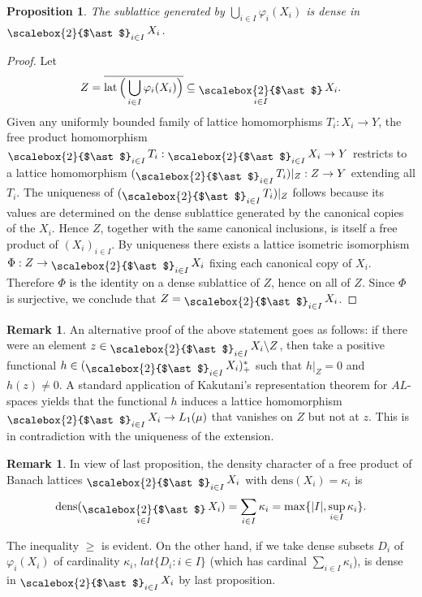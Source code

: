 \documentclass[12pt]{amsart}
\DeclareMathOperator{\lat}{lat}
\DeclareMathOperator*{\bigfree}{\raisebox{-0.6ex}{\scalebox{2}{$\ast$}}}
\theoremstyle{plain}
\newtheorem{proposition}[theorem]{Proposition}
\theoremstyle{definition}
\newtheorem{remark}[theorem]{Remark}
\begin{document}
\begin{proposition}\label{prop:dense-sublattice}
The sublattice generated by $\bigcup_{i\in I}\varphi_i(X_i)$ is dense in $\bigfree_{i\in I}X_i$.
\end{proposition}

\begin{proof}
Let
\[
Z=\overline{\lat\Big(\bigcup_{i\in I}\varphi_i(X_i)\Big)} \subseteq \bigfree_{i\in I}X_i.
\]
Given any uniformly bounded family of lattice homomorphisms $T_i:X_i\to Y$, the free product homomorphism $\bigfree_{i\in I}T_i:\bigfree_{i\in I}X_i\to Y$ restricts to a lattice homomorphism $(\bigfree_{i\in I}T_i)|_Z:Z\to Y$ extending all $T_i$. The uniqueness of $(\bigfree_{i\in I}T_i)|_Z$ follows because its values are determined on the dense sublattice generated by the canonical copies of the $X_i$. Hence $Z$, together with the same canonical inclusions, is itself a free product of $(X_i)_{i\in I}$. By uniqueness there exists a lattice isometric isomorphism $\Phi:Z\to \bigfree_{i\in I}X_i$ fixing each canonical copy of $X_i$. Therefore $\Phi$ is the identity on a dense sublattice of $Z$, hence on all of $Z$. Since $\Phi$ is surjective, we conclude that $Z=\bigfree_{i\in I}X_i$.
\end{proof}

\begin{remark} An alternative proof of the above statement goes as follows: if there were an element $z\in \bigfree_{i\in I}X_i\backslash Z$, then take a positive functional $h\in (\bigfree_{i\in I} X_i)^*_+$ such that $h|_Z=0$ and $h(z)\neq 0$. A standard application of Kakutani's representation theorem for $AL$-spaces yields that the functional $h$ induces a lattice homomorphism $\bigfree_{i\in I} X_i\rightarrow L_1(\mu)$ that vanishes on $Z$ but not at $z$. This is in contradiction with the uniqueness of the extension.
\end{remark}

\begin{remark}
In view of last proposition, the density character of a free product of Banach lattices $\bigfree_{i\in I} X_i$ with $\text{dens}(X_i)=\kappa_i$ is 
\begin{align*}
\text{dens}(\bigfree_{i\in I}X_i)=\sum_{i\in I}\kappa_i=\max\{|I|,\sup_{i\in I}\kappa_i\}.
\end{align*}

The inequality $\geq$ is evident. On the other hand, if we take dense subsets $D_i$ of $\varphi_i(X_i)$ of cardinality $\kappa_i$, $lat\{D_i:i\in I\}$ (which has cardinal $\sum_{i\in I} \kappa_i$),  is dense in $\bigfree_{i\in I} X_i$ by last proposition.
\end{remark}
\end{document}
